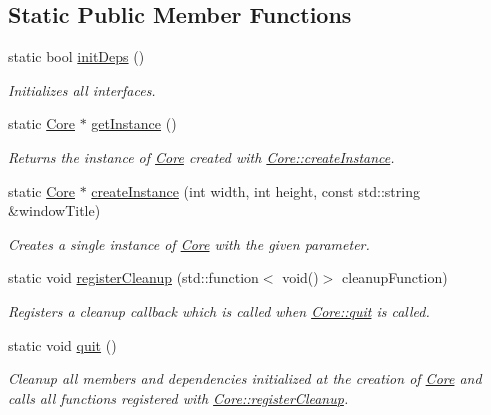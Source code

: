 \subsection*{Static Public Member Functions}
\begin{DoxyCompactItemize}
\item 
\mbox{\label{classbkengine_1_1Core_ad5185a24e7bada8bc8ee70b6c27b7c45}} 
static bool \hyperlink{classbkengine_1_1Core_ad5185a24e7bada8bc8ee70b6c27b7c45}{init\+Deps} ()
\begin{DoxyCompactList}\small\item\em Initializes all interfaces. \end{DoxyCompactList}\item 
static \hyperlink{classbkengine_1_1Core}{Core} $\ast$ \hyperlink{classbkengine_1_1Core_a6d89a3e61f9a485ce2ff6586c340e94b}{get\+Instance} ()
\begin{DoxyCompactList}\small\item\em Returns the instance of \hyperlink{classbkengine_1_1Core}{Core} created with \hyperlink{classbkengine_1_1Core_a8b809ebbd1348ae9b59d49388e7a18f0}{Core\+::create\+Instance}. \end{DoxyCompactList}\item 
static \hyperlink{classbkengine_1_1Core}{Core} $\ast$ \hyperlink{classbkengine_1_1Core_a8b809ebbd1348ae9b59d49388e7a18f0}{create\+Instance} (int width, int height, const std\+::string \&window\+Title)
\begin{DoxyCompactList}\small\item\em Creates a single instance of \hyperlink{classbkengine_1_1Core}{Core} with the given parameter. \end{DoxyCompactList}\item 
static void \hyperlink{classbkengine_1_1Core_a629951e5dec1e2c3f387790bd9ebb920}{register\+Cleanup} (std\+::function$<$ void()$>$ cleanup\+Function)
\begin{DoxyCompactList}\small\item\em Registers a cleanup callback which is called when \hyperlink{classbkengine_1_1Core_a7d6ca7943e0aa8d8d33a151fdc131f6e}{Core\+::quit} is called. \end{DoxyCompactList}\item 
static void \hyperlink{classbkengine_1_1Core_a7d6ca7943e0aa8d8d33a151fdc131f6e}{quit} ()
\begin{DoxyCompactList}\small\item\em Cleanup all members and dependencies initialized at the creation of \hyperlink{classbkengine_1_1Core}{Core} and calls all functions registered with \hyperlink{classbkengine_1_1Core_a629951e5dec1e2c3f387790bd9ebb920}{Core\+::register\+Cleanup}. \end{DoxyCompactList}\end{DoxyCompactItemize}


